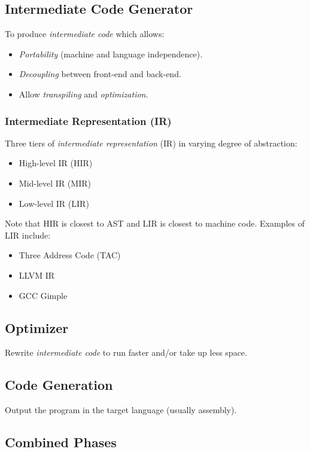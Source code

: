 \subsection{Intermediate Code Generator}

To produce \textit{intermediate code} which allows:
\begin{itemize}
    \item \textit{Portability} (machine and language independence).
    \item \textit{Decoupling} between front-end and back-end.
    \item Allow \textit{transpiling} and \textit{optimization}.
\end{itemize}

\subsubsection{Intermediate Representation (IR)}

Three tiers of \textit{intermediate representation} (IR) in varying degree of abstraction:
\begin{itemize}
    \item High-level IR (HIR)
    \item Mid-level IR (MIR)
    \item Low-level IR (LIR)
\end{itemize}

Note that HIR is closest to AST and LIR is closest to machine code. Examples of LIR include:
\begin{itemize}
    \item Three Address Code (TAC)
    \item LLVM IR
    \item GCC Gimple
\end{itemize}

\subsection{Optimizer}

Rewrite \textit{intermediate code} to run faster and/or take up less space.

\subsection{Code Generation}

Output the program in the target language (usually assembly).

\subsection{Combined Phases}

